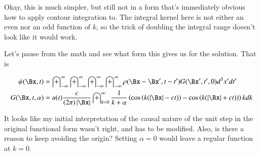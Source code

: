 \documentclass{article}
\newcommand{\IIinf}[0]{ \int_{-\infty}^\infty }
\begin{document}
Okay, this is much simpler, but still not in a form that's immediately obvious how to apply contour integration to.  The integral
kernel here is not either an even nor an odd function of $k$, so the trick of doubling the integral range doesn't look like it would
work.

Let's pause from the math and see what form this gives us for the solution.  That is

\begin{align}
{\psi}(\Bx, t) &= \IIinf \IIinf \IIinf \IIinf \rho(\Bx - \Bx', t - t') G(\Bx', t', 0) d^3 x' dt' \\
G(\Bx, t, \alpha) &= u(t) 
\frac{c }{(2\pi) \Abs{\Bx}} 
\int_{k=0}^\infty \frac{1}{k + \alpha} \left( \cos\left( k (\Abs{\Bx}-c t) \right) -\cos\left( k (\Abs{\Bx}+c t) \right) \right) k dk
\end{align}

It looks like my initial interpretation of the causal nature of the unit step in the original functional form wasn't right,
and has to be modified.  Also, is there a reason to keep avoiding the origin?  Setting $\alpha = 0$ would leave a regular function at $k = 0$.



\end{document}
